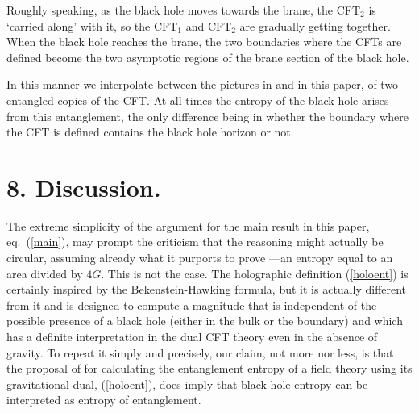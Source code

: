 \documentclass[12pt]{article}
\newcommand{\reef}[1]{(\ref{#1})}
\begin{document}
Roughly speaking, as the black hole moves towards the brane, the CFT$_2$
is `carried along' with it, so the CFT$_1$ and CFT$_2$ are gradually
getting together. When the black hole reaches the brane, the two
boundaries where the CFTs are defined become the two asymptotic regions
of the brane section of the black hole.

In this manner we interpolate between the pictures in \cite{malda} and
in this paper, of two entangled copies of the CFT. At all times the
entropy of the black hole arises from this entanglement, the only
difference being in whether the boundary where the CFT is defined
contains the black hole horizon or not.



\section{8. Discussion.} The extreme simplicity of the argument
for the main result in this paper, eq.~\reef{main}, may prompt the
criticism that the reasoning might actually be circular, assuming already what
it purports to prove ---an entropy equal to an area divided by $4G$.
This is not the case. The holographic definition \reef{holoent} is
certainly inspired by the Bekenstein-Hawking formula, but it is actually
different from it and is designed to compute a magnitude that is
independent of the possible presence of a black hole (either in the bulk
or the boundary) and which has a definite interpretation in the dual CFT
theory even in the absence of gravity. To repeat it simply and precisely,
our claim, not more nor less, is that the proposal of \cite{ryta} for
calculating the entanglement entropy of a field theory using its
gravitational dual, \reef{holoent}, does imply that black hole entropy
can be interpreted as entropy of entanglement.
\end{document}
